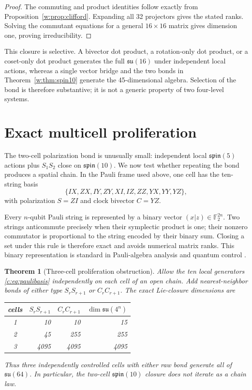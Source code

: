\documentclass[11pt]{article}
\newtheorem{theorem}{Theorem}[section]
\theoremstyle{remark}\newtheorem{remark}[theorem]{Remark}
\begin{document}
\begin{proof}
The commuting and product identities follow exactly from Proposition~\ref{w:prop:clifford}.  Expanding all 32 projectors gives the stated ranks.  Solving the commutant equations for a general $16\times16$ matrix gives dimension one, proving irreducibility.
\end{proof}

This closure is selective.  A bivector dot product, a rotation-only dot product, or a coset-only dot product generates the full $\mathfrak{su}(16)$ under independent local actions, whereas a single vector bridge and the two bonds in Theorem~\ref{w:thm:spin10} generate the 45-dimensional algebra.  Selection of the bond is therefore substantive; it is not a generic property of two four-level systems.



\section{Exact multicell proliferation}

The two-cell polarization bond is unusually small: independent local $\mathfrak{spin}(5)$ actions plus $S_1S_2$ close on $\mathfrak{spin}(10)$.  We now test whether repeating the bond produces a spatial chain.  In the Pauli frame used above, one cell has the ten-string basis
\begin{equation}
\{IX,ZX,IY,ZY,XI,IZ,ZZ,YX,YY,YZ\},
\label{c:eq:paulibasis}
\end{equation}
with polarization $S=ZI$ and clock bivector $C=YZ$.

Every $n$-qubit Pauli string is represented by a binary vector $(x|z)\in\mathbb F_2^{2n}$.  Two strings anticommute precisely when their symplectic product is one; their nonzero commutator is proportional to the string encoded by their binary sum.  Closing a set under this rule is therefore exact and avoids numerical matrix ranks.  This binary representation is standard in Pauli-algebra analysis and quantum control \cite{Cuypers2026}.

\begin{theorem}[Three-cell proliferation obstruction]\label{c:thm:proliferation}
Allow the ten local generators \eqref{c:eq:paulibasis} independently on each cell of an open chain.  Add nearest-neighbor bonds of either type $S_rS_{r+1}$ or $C_rC_{r+1}$.  The exact Lie-closure dimensions are
\begin{center}
\begin{tabular}{c@{\qquad}r@{\qquad}r@{\qquad}r}
\toprule
cells & $S_rS_{r+1}$ & $C_rC_{r+1}$ & $\dim\mathfrak{su}(4^n)$\\
\midrule
1 & 10 & 10 & 15\\
2 & 45 & 255 & 255\\
3 & 4095 & 4095 & 4095\\
\bottomrule
\end{tabular}
\end{center}
Thus three independently controlled cells with either raw bond generate all of $\mathfrak{su}(64)$.  In particular, the two-cell $\mathfrak{spin}(10)$ closure does not iterate as a chain law.
\end{theorem}
\end{document}
